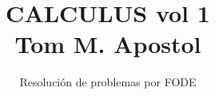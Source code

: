 \normalfont

\author{\Large Resolución de problemas por FODE}
\title{CALCULUS vol 1\\ \small Tom M. Apostol}
\date{}
\pagestyle{empty}
\maketitle
\thispagestyle{empty}
\let\cleardoublepage\clearpage
\tableofcontents								%


 
\let\cleardoublepage\clearpage